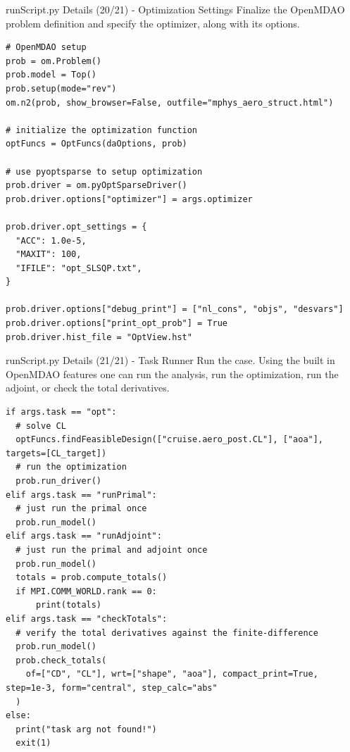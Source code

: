 \documentclass{bredelebeamer}
\begin{document}
\begin{frame}[fragile]{runScript.py Details (20/21) - \large Optimization Settings}
Finalize the OpenMDAO problem definition and specify the optimizer, along with its options.
\scriptsize
\lstset{ language=bash }
\begin{lstlisting}
# OpenMDAO setup
prob = om.Problem()
prob.model = Top()
prob.setup(mode="rev")
om.n2(prob, show_browser=False, outfile="mphys_aero_struct.html")

# initialize the optimization function
optFuncs = OptFuncs(daOptions, prob)

# use pyoptsparse to setup optimization
prob.driver = om.pyOptSparseDriver()
prob.driver.options["optimizer"] = args.optimizer

prob.driver.opt_settings = {
  "ACC": 1.0e-5,
  "MAXIT": 100,
  "IFILE": "opt_SLSQP.txt",
}

prob.driver.options["debug_print"] = ["nl_cons", "objs", "desvars"]
prob.driver.options["print_opt_prob"] = True
prob.driver.hist_file = "OptView.hst"

\end{lstlisting}
\normalsize
\end{frame}

\begin{frame}[fragile]{runScript.py Details (21/21) - \large Task Runner}
Run the case. Using the built in OpenMDAO features one can run the analysis, run the optimization, run the adjoint, or check the total derivatives.
\scriptsize
\lstset{ language=bash }
\begin{lstlisting}
if args.task == "opt":
  # solve CL
  optFuncs.findFeasibleDesign(["cruise.aero_post.CL"], ["aoa"], targets=[CL_target])
  # run the optimization
  prob.run_driver()
elif args.task == "runPrimal":
  # just run the primal once
  prob.run_model()
elif args.task == "runAdjoint":
  # just run the primal and adjoint once
  prob.run_model()
  totals = prob.compute_totals()
  if MPI.COMM_WORLD.rank == 0:
      print(totals)
elif args.task == "checkTotals":
  # verify the total derivatives against the finite-difference
  prob.run_model()
  prob.check_totals(
    of=["CD", "CL"], wrt=["shape", "aoa"], compact_print=True, step=1e-3, form="central", step_calc="abs"
  )
else:
  print("task arg not found!")
  exit(1)
\end{lstlisting}
\normalsize
\end{frame}
\end{document}

